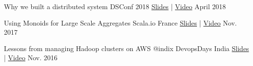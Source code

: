 \begin{cvhonors}

  \cvhonor
    {Why we built a distributed system} %
    {DSConf 2018} %
    {\href{https://speakerdeck.com/ashwanthkumar/why-we-built-a-distributed-system-dsconf-2018}{Slides} | \href{https://www.youtube.com/watch?v=zSgxt9JsTPg&index=11&list=PLyMKpkdEV2csQg93bEPv2R27sawxIm9zG}{Video}} %
    {April 2018} %


  \cvhonor
    {Using Monoids for Large Scale Aggregates} %
    {Scala.io France} %
    {\href{https://speakerdeck.com/ashwanthkumar/using-monoids-for-large-scale-aggregates}{Slides} | \href{https://www.youtube.com/watch?v=UW3Z_rIPn3w}{Video}} %
    {Nov. 2017} %

  \cvhonor
    {Lessons from managing Hadoop clusters on AWS @indix} %
    {DevopsDays India} %
    {\href{http://bit.ly/autoscaling-on-aws}{Slides} | \href{https://www.youtube.com/watch?v=eBbgylpRufQ}{Video}} %
    {Nov. 2016} %

\end{cvhonors}
